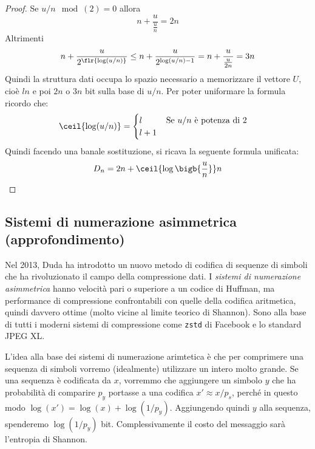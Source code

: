 \begin{proof}
    Se $u/n \mod(2) = 0$ allora
    \begin{equation*}
        n + \frac{u}{\frac{u}{n}} = 2n
    \end{equation*}
    Altrimenti
    \begin{equation*}
        n + \frac{u}{2^{\flr{\log(u/n)}}} \leq  n + \frac{u}{2^{\log(u/n) - 1}} = n + \frac{u}{\frac{u}{2n}} = 3n
    \end{equation*}
    Quindi la struttura dati occupa lo spazio necessario a memorizzare il vettore $U$, cioè $ln$ e poi $2n$ o $3n$ bit sulla base di $u/n$. Per poter uniformare la formula ricordo che:
    \begin{equation*}
        \ceil{\log(u/n)} =
        \begin{cases}
            l \hspace{1cm}\textnormal{Se $u/n$ è potenza di 2}\\
            l + 1
        \end{cases}
    \end{equation*}
    Quindi facendo una banale sostituzione, si ricava la seguente formula unificata:
    \begin{equation}
        D_n = 2n + \ceil{\log\bigb{\frac{u}{n}}}n
    \end{equation}
\end{proof}
\subsection{Sistemi di numerazione asimmetrica (approfondimento)}
Nel 2013, Duda \cite{duda} ha introdotto un nuovo metodo di codifica di sequenze di simboli che ha rivoluzionato il campo della compressione dati. I \textit{sistemi di numerazione asimmetrica} hanno velocità pari o superiore a un codice di Huffman, ma performance di compressione confrontabili con quelle della codifica aritmetica, quindi davvero ottime (molto vicine al limite teorico di Shannon). Sono alla base di tutti i moderni sistemi di compressione come \texttt{zstd} di Facebook e lo standard JPEG XL.

L'idea alla base dei sistemi di numerazione arimtetica è che per comprimere una sequenza di simboli vorremo (idealmente) utilizzare un intero molto grande. Se una sequenza è codificata da $x$, vorremmo che aggiungere un simbolo $y$ che ha probabilità di comparire $p_y$ portasse a una codifica $x' \approx x / p_s$, perché in questo modo $\log(x') = \log(x) + \log(1 / p_y)$. Aggiungendo quindi $y$ alla sequenza, spenderemo $\log(1 / p_y)$ bit. Complessivamente il costo del messaggio sarà l'entropia di Shannon.

